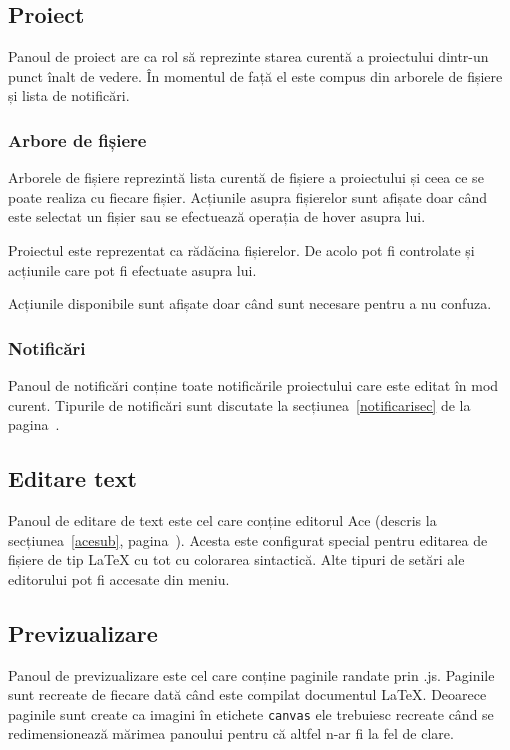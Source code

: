 \documentclass[a4wide,12pt]{report}
\newcommand{\eng}[1]{{#1}} %
\newcommand{\cod}[1]{\texttt{#1}}
\newcommand{\acr}[1]{{\textsmaller[1]{\textsc{#1}}}} %
\begin{document}
\subsection{Proiect}

Panoul de proiect are ca rol să reprezinte starea curentă a proiectului dintr-un
punct înalt de vedere. În momentul de față el este compus din arborele de
fișiere și lista de notificări.

\subsubsection{Arbore de fișiere}

Arborele de fișiere reprezintă lista curentă de fișiere a proiectului și ceea ce
se poate realiza cu fiecare fișier. Acțiunile asupra fișierelor sunt afișate
doar când este selectat un fișier sau se efectuează operația de \eng{hover}
asupra lui.

Proiectul este reprezentat ca rădăcina fișierelor. De acolo pot fi controlate și
acțiunile care pot fi efectuate asupra lui.

Acțiunile disponibile sunt afișate doar când sunt necesare pentru a nu confuza.

\subsubsection{Notificări}

Panoul de notificări conține toate notificările proiectului care este editat în
mod curent. Tipurile de notificări sunt discutate la
secțiunea~\ref{notificarisec} de la pagina~\pageref{notificarisec}.

\subsection{Editare text}

Panoul de editare de text este cel care conține editorul Ace (descris la
secțiunea~\ref{acesub}, pagina~\pageref{acesub}). Acesta este configurat special
pentru editarea de fișiere de tip \LaTeX{} cu tot cu colorarea sintactică. Alte
tipuri de setări ale editorului pot fi accesate din meniu.

\subsection{Previzualizare}

Panoul de previzualizare este cel care conține paginile randate prin
\acr{PDF}.js. Paginile sunt recreate de fiecare dată când este compilat
documentul \LaTeX{}. Deoarece paginile sunt create ca imagini în etichete
\cod{canvas} ele trebuiesc recreate când se redimensionează mărimea panoului
pentru că altfel n-ar fi la fel de clare.
\end{document}
